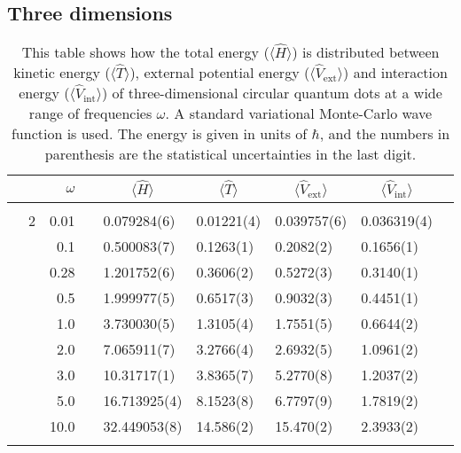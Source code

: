 \subsection{Three dimensions}
\begin{table}[H]
	\caption{This table shows how the total energy ($\langle\hat{H}\rangle$) is distributed between kinetic energy ($\langle\hat{T}\rangle$), external potential energy ($\langle\hat{V}_{\text{ext}}\rangle$) and interaction energy ($\langle\hat{V}_{\text{int}}\rangle$) of three-dimensional circular quantum dots at a wide range of frequencies $\omega$. A standard variational Monte-Carlo wave function is used. The energy is given in units of $\hbar$, and the numbers in parenthesis are the statistical uncertainties in the last digit.}
	\label{tab:splitfrequencyQDVMC3D}
	\begin{tabularx}{\textwidth}{R{1cm}rrcR{2.3cm}R{2.3cm}R{2.3cm}R{2.3cm}R{1cm}} \hline\hline
		&\makecell{\\ \phantom{$N$} \\ \phantom{=}} & $\omega$ &&  &  &  &  & \\ \hline \\
		&2 & 0.01 && 0.079284(6) & 0.01221(4) & 0.039757(6) & 0.036319(4) \\
		&& 0.1 && 0.500083(7) & 0.1263(1) & 0.2082(2) & 0.1656(1) \\
		&& 0.28 && 1.201752(6) & 0.3606(2) & 0.5272(3) & 0.3140(1) \\
		&& 0.5 && 1.999977(5) & 0.6517(3) & 0.9032(3) & 0.4451(1) \\
		&& 1.0 && 3.730030(5) & 1.3105(4) & 1.7551(5) & 0.6644(2) \\
		&& 2.0 && 7.065911(7) & 3.2766(4) & 2.6932(5) & 1.0961(2) \\
		&& 3.0 && 10.31717(1) & 3.8365(7) & 5.2770(8) & 1.2037(2) \\ 
		&& 5.0 && 16.713925(4) & 8.1523(8) & 6.7797(9) & 1.7819(2) \\
		&& 10.0 && 32.449053(8) & 14.586(2) & 15.470(2) & 2.3933(2) \\
		\hdashline \\
		

\end{tabularx}
\end{table}
